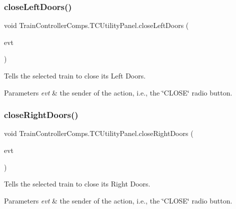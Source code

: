 \subsubsection{\texorpdfstring{close\+Left\+Doors()}{closeLeftDoors()}}
{\footnotesize\ttfamily void Train\+Controller\+Comps.\+T\+C\+Utility\+Panel.\+close\+Left\+Doors (\begin{DoxyParamCaption}\item[{java.\+awt.\+event.\+Action\+Event}]{evt }\end{DoxyParamCaption})\hspace{0.3cm}{\ttfamily [private]}}



Tells the selected train to close its Left Doors. 


\begin{DoxyParams}{Parameters}
{\em evt} & the sender of the action, i.\+e., the \char`\"{}\+C\+L\+O\+S\+E\char`\"{} radio button. \\
\hline
\end{DoxyParams}
\mbox{\label{classTrainControllerComps_1_1TCUtilityPanel_a11c919b1746a816666bf4b9f6b03c198}} 
\subsubsection{\texorpdfstring{close\+Right\+Doors()}{closeRightDoors()}}
{\footnotesize\ttfamily void Train\+Controller\+Comps.\+T\+C\+Utility\+Panel.\+close\+Right\+Doors (\begin{DoxyParamCaption}\item[{java.\+awt.\+event.\+Action\+Event}]{evt }\end{DoxyParamCaption})\hspace{0.3cm}{\ttfamily [private]}}



Tells the selected train to close its Right Doors. 


\begin{DoxyParams}{Parameters}
{\em evt} & the sender of the action, i.\+e., the \char`\"{}\+C\+L\+O\+S\+E\char`\"{} radio button. \\
\hline
\end{DoxyParams}
\mbox{\label{classTrainControllerComps_1_1TCUtilityPanel_a091dbeb6c0141d636465138a2d535613}} 
